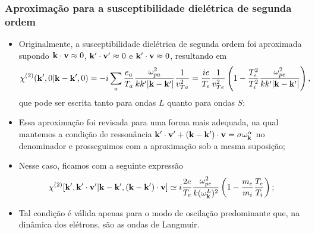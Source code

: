 \documentclass[10pt,aspectratio=1610,lualatex]{beamer}
\begin{document}
\begin{frame}
  \frametitle{Aproximação para a susceptibilidade dielétrica de segunda
    ordem}
  \begin{itemize}
    \item Originalmente, a susceptibilidade dielétrica de segunda
    ordem foi aproximada supondo ${\bf k \cdot v}\approx 0$,
    ${\bf k'\cdot v'}\approx 0$ e ${\bf k' \cdot v}\approx 0$,
    resultando em
    \begin{equation*}
      \chi^{(2)}({\bf k}',0|{\bf k}-{\bf k}',0)
      =-i \sum_a\frac{e_a}{T_a}
      \frac{\omega_{pa}^2}{k k' |{\bf k-k'}|}\frac{1}{v_{Ta}^2}
      =\frac{i e}{T_e}\frac{1}{v_{Te}^2}\left( 1-\frac{T_e^2}{T_i^2}
      \frac{\omega_{pe}^2}{k k' |{\bf k-k'}|}\right),
    \end{equation*}
    que pode ser escrita tanto para ondas $L$ quanto para ondas $S$;
    \pause
    \item Essa aproximação foi revisada para uma forma mais adequada,
    na qual mantemos a condição de ressonância
    ${\bf k'\cdot v'}+({\bf k-k'})\cdot{\bf v}=\sigma\omega_{\bf k}^\alpha$
    no denominador e prosseguimos com a aproximação sob a mesma suposição;
    \pause
    \vspace{0.1cm}
    \item Nesse caso, ficamos com a seguinte expressão 
    \begin{equation*}
      \chi^{(2)}[{\bf k'},{\bf k'\cdot v'}|{\bf k-k'},({\bf k-k'})\cdot{\bf v}]
      \simeq i\frac{2e}{T_e}\frac{\omega_{pe}^2}{k(\omega_{\bf k}^L)^2}
      \left(1-\frac{m_e}{m_i}\frac{T_e}{T_i}\right);
    \end{equation*}
    \pause
    \vspace{-0.3cm}
    \item Tal condição é válida apenas para o modo de oscilação
    predominante que, na dinâmica dos elétrons, são as ondas de
    Langmuir.    
  \end{itemize}
\end{frame}
\end{document}
